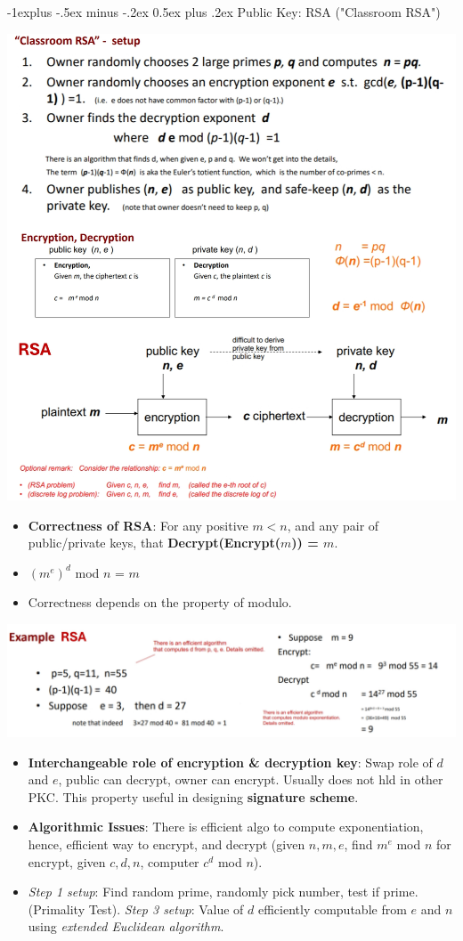 \documentclass[10pt, landscape]{article}
\makeatletter
\renewcommand{\subsection}{\@startsection{subsection}{2}{0mm}%
                                {-1explus -.5ex minus -.2ex}%
                                {0.5ex plus .2ex}%
                                {\normalfont\normalsize\bfseries}}
\makeatother
\begin{document}
\begin{multicols*}{3}
\subsection{Public Key: RSA ("Classroom RSA")}
\centerline{\includegraphics[width=1\linewidth]{classroomRSA}}
\begin{itemize}
\item \textbf{Correctness of RSA}: For any positive $m < n$, and any pair of public/private keys, that \textbf{Decrypt(Encrypt($m$)) = $m$}.
\item $(m^e)^d$ mod $n$ = $m$
\item Correctness depends on the property of modulo.
\end{itemize}
\centerline{\includegraphics[width=0.9\linewidth]{RSAexample}}
\begin{itemize}
\item \textbf{Interchangeable role of encryption \& decryption key}: Swap role of $d$ and $e$, public can decrypt, owner can encrypt. Usually does not hld in other PKC. This property useful in designing \textbf{signature scheme}.
\item \textbf{Algorithmic Issues}: There is efficient algo to compute exponentiation, hence, efficient way to encrypt, and decrypt (given $n, m, e$, find $m^e$ mod $n$ for encrypt, given $c, d, n$, computer $c^d$ mod $n$).
\item \textit{Step 1 setup}:  Find random prime, randomly pick number, test if prime. (Primality Test). 
\textit{Step 3 setup}: Value of $d$ efficiently computable from $e$ and $n$ using \textit{extended Euclidean algorithm}.
\end{itemize}


\end{multicols*}
\end{document}
